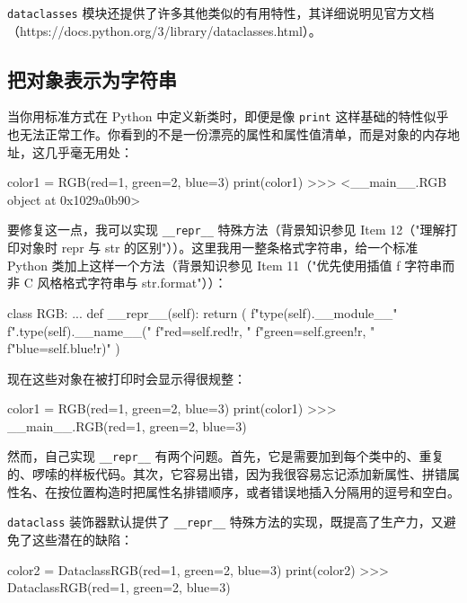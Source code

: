 \texttt{dataclasses} 模块还提供了许多其他类似的有用特性，其详细说明见官方文档（https://docs.python.org/3/library/dataclasses.html）。

\subsection{把对象表示为字符串}

当你用标准方式在 Python 中定义新类时，即便是像 \texttt{print} 这样基础的特性似乎也无法正常工作。你看到的不是一份漂亮的属性和属性值清单，而是对象的内存地址，这几乎毫无用处：

\begin{codebox}[python]
color1 = RGB(red=1, green=2, blue=3)
print(color1)
>>>
<__main__.RGB object at 0x1029a0b90>
\end{codebox}

要修复这一点，我可以实现 \texttt{\_\_repr\_\_} 特殊方法（背景知识参见 Item 12（"理解打印对象时 repr 与 str 的区别"））。这里我用一整条格式字符串，给一个标准 Python 类加上这样一个方法（背景知识参见 Item 11（"优先使用插值 f 字符串而非 C 风格格式字符串与 str.format"））：

\begin{codebox}[python]
class RGB:
    ...
    def __repr__(self):
        return (
            f"{type(self).__module__}"
            f".{type(self).__name__}("
            f"red={self.red!r}, "
            f"green={self.green!r}, "
            f"blue={self.blue!r})"
        )
\end{codebox}

现在这些对象在被打印时会显示得很规整：

\begin{codebox}[python]
color1 = RGB(red=1, green=2, blue=3)
print(color1)
>>>
__main__.RGB(red=1, green=2, blue=3)
\end{codebox}

然而，自己实现 \texttt{\_\_repr\_\_} 有两个问题。首先，它是需要加到每个类中的、重复的、啰嗦的样板代码。其次，它容易出错，因为我很容易忘记添加新属性、拼错属性名、在按位置构造时把属性名排错顺序，或者错误地插入分隔用的逗号和空白。

\texttt{dataclass} 装饰器默认提供了 \texttt{\_\_repr\_\_} 特殊方法的实现，既提高了生产力，又避免了这些潜在的缺陷：

\begin{codebox}[python]
color2 = DataclassRGB(red=1, green=2, blue=3)
print(color2)
>>>
DataclassRGB(red=1, green=2, blue=3)
\end{codebox}


